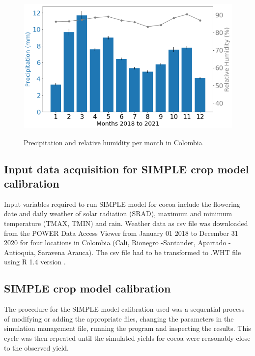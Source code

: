 \documentclass[gene,journal,article,submit,moreauthors,pdftex]{Definitions/mdpi}
\begin{document}
\begin{figure}[h!]
	\centering
	\caption{\footnotesize {Precipitation and relative humidity per month in Colombia \\}}
	\includegraphics[scale=0.4]{images/rainmonth.png}
	\label{fig:rain}
\end{figure}
\newpage

\subsection{Input data acquisition for SIMPLE crop model calibration}
Input variables required to run SIMPLE model for cocoa include the flowering date and daily weather of solar radiation (SRAD), maximum and minimum temperature (TMAX, TMIN) and rain. Weather data as csv file was  downloaded from the POWER Data Access Viewer \citep{nasapower} from January 01 2018 to December 31 2020 for four locations in Colombia (Cali, Rionegro -Santander, Apartado - Antioquia, Saravena Arauca). The csv file had to be transformed to .WHT file using R 1.4 version \citep{Rstudio2020}. 





\subsection{SIMPLE crop model calibration}

The procedure for the SIMPLE model \citep{Zao2019simple}calibration used was a sequential process of modifying or adding the appropriate files, changing the parameters in the simulation management file, running the program and inspecting the results. This cycle was then repeated until the  simulated yields for cocoa were reasonably close to the observed yield. 
\end{document}
